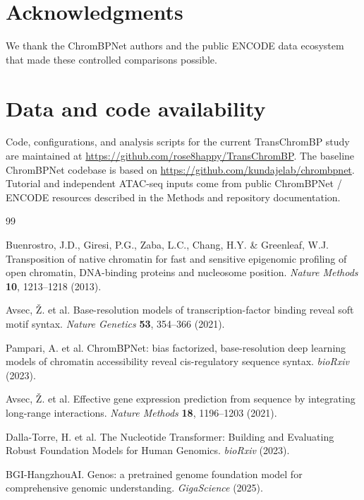 \documentclass[11pt,a4paper]{article}
\begin{document}
\section*{Acknowledgments}
We thank the ChromBPNet authors and the public ENCODE data ecosystem that
made these controlled comparisons possible.

\section*{Data and code availability}
Code, configurations, and analysis scripts for the current TransChromBP
study are maintained at
\url{https://github.com/rose8happy/TransChromBP}. The baseline
ChromBPNet codebase is based on
\url{https://github.com/kundajelab/chrombpnet}. Tutorial and independent
ATAC-seq inputs come from public ChromBPNet / ENCODE resources described
in the Methods and repository documentation.

\begin{thebibliography}{99}

Buenrostro, J.D., Giresi, P.G., Zaba, L.C., Chang, H.Y. \& Greenleaf, W.J.
Transposition of native chromatin for fast and sensitive epigenomic profiling
of open chromatin, DNA-binding proteins and nucleosome position.
\emph{Nature Methods} \textbf{10}, 1213--1218 (2013).

Avsec, \v{Z}. et al. Base-resolution models of transcription-factor binding
reveal soft motif syntax. \emph{Nature Genetics} \textbf{53}, 354--366 (2021).

Pampari, A. et al. ChromBPNet: bias factorized, base-resolution deep learning
models of chromatin accessibility reveal cis-regulatory sequence syntax.
\emph{bioRxiv} (2023).

Avsec, \v{Z}. et al. Effective gene expression prediction from sequence by
integrating long-range interactions. \emph{Nature Methods} \textbf{18},
1196--1203 (2021).

Dalla-Torre, H. et al. The Nucleotide Transformer: Building and Evaluating
Robust Foundation Models for Human Genomics. \emph{bioRxiv} (2023).

BGI-HangzhouAI. Genos: a pretrained genome foundation model for
comprehensive genomic understanding. \emph{GigaScience} (2025).

\end{thebibliography}
\end{document}
